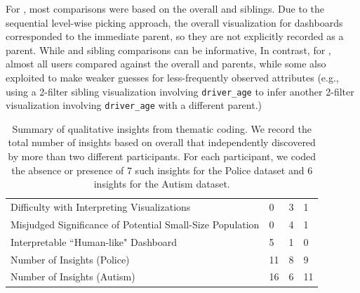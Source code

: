 \par For \BFS, most comparisons were based on the overall and siblings. Due to the sequential level-wise picking approach, the overall visualization for \BFS dashboards corresponded to the immediate parent, so they are not explicitly recorded as a parent. While  and sibling comparisons can be informative,  In contrast, for \system, almost all users compared against the overall and parents, while some also exploited  to make weaker guesses for less-frequently observed attributes (e.g., using a 2-filter sibling visualization involving \texttt{driver\_age} to infer another 2-filter visualization involving \texttt{driver\_age} with a different parent.)
\begin{table}[ht!]
	\centering
	\begin{tabular}{|l|l|l|l|}
	\hline & \system & \cluster & \BFS \\ \hline
	Difficulty with Interpreting Visualizations & 0 & \cellcolor[HTML]{FD6864}3 & 1 \\ \hline
	Misjudged Significance of Potential Small-Size Population & 0 & \cellcolor[HTML]{FD6864}4 & 1 \\ \hline
	Interpretable ``Human-like" Dashboard & \cellcolor[HTML]{9AFF99}5 & 1 & 0 \\ \hline
	Number of Insights (Police) & \cellcolor[HTML]{9AFF99}11 & 8 & 9 \\ \hline
	Number of Insights (Autism) & \cellcolor[HTML]{9AFF99}16 & 6 & 11 \\\hline
	\end{tabular}
\caption{Summary of qualitative insights from thematic coding. We record the total number of insights based on overall  that  independently discovered by more than two different participants. For each participant, we coded the absence or presence of 7 such insights for the Police dataset and 6 insights for the Autism dataset.}%
\label{table:thematic_summary}
\vspace{-15pt}
\end{table}
